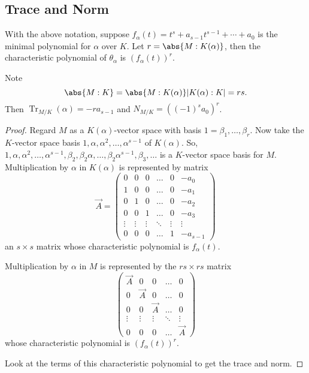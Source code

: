 \documentclass{article}
\DeclareMathOperator{\Tr}{Tr}
\begin{document}
\subsection{Trace and Norm}

\begin{nthm}\label{thm:2.19}
    With the above notation, suppose $f_\alpha(t) = t^s + a_{s-1} t^{s-1} + \dotsb + a_0$ is the minimal polynomial for $\alpha$ over $K$.
    Let $r = \abs{M:K(\alpha)}$, then the characteristic polynomial of $\theta_\alpha$ is $(f_\alpha(t))^r$.

    Note \begin{equation*}\abs{M:K} = \abs{M:K(\alpha)} |K(\alpha) : K| = rs.\end{equation*}
    Then $\Tr_{M/K} (\alpha) = -r a_{s-1}$ and $N_{M/K} = ((-1)^s a_0)^r$.
\end{nthm}
\begin{proof}
    Regard $M$ as a $K(\alpha)$-vector space with basis $1 = \beta_1, \dotsc, \beta_r$.
    Now take the $K$-vector space basis $1, \alpha, \alpha^2, \dotsc, \alpha^{s-1}$ of $K(\alpha)$.
    So, $1, \alpha, \alpha^2, \dotsc, \alpha^{s-1}, \beta_2, \beta_2 \alpha, \dotsc, \beta_2 \alpha^{s-1}, \beta_3, \dotsc$ is a $K$-vector space basis for $M$.
    Multiplication by $\alpha$ in $K(\alpha)$ is represented by matrix
    \begin{equation*}
        \vec{A} =
        \begin{pmatrix}
            0      & 0      & 0      & \dots  & 0      & -a_0     \\
            1      & 0      & 0      & \dots  & 0      & -a_1     \\
            0      & 1      & 0      & \dots  & 0      & -a_2     \\
            0      & 0      & 1      & \dots  & 0      & -a_3     \\
            \vdots & \vdots & \vdots & \ddots & \vdots & \vdots   \\
            0      & 0      & 0      & \dots  & 1      & -a_{s-1}
        \end{pmatrix}
    \end{equation*}
    an $s \times s$ matrix whose characteristic polynomial is $f_\alpha(t)$.

    Multiplication by $\alpha$ in $M$ is represented by the $rs \times rs$ matrix
    \begin{equation*}
        \begin{pmatrix}
            \vec{A} & 0       & 0       & \dots  & 0       \\
            0       & \vec{A} & 0       & \dots  & 0       \\
            0       & 0       & \vec{A} & \dots  & 0       \\
            \vdots  & \vdots  & \vdots  & \ddots & \vdots  \\
            0       & 0       & 0       & \dots  & \vec{A}
        \end{pmatrix}
    \end{equation*}
    whose characteristic polynomial is $(f_\alpha(t))^r$.

    Look at the terms of this characteristic polynomial to get the trace and norm.
\end{proof}
\end{document}
